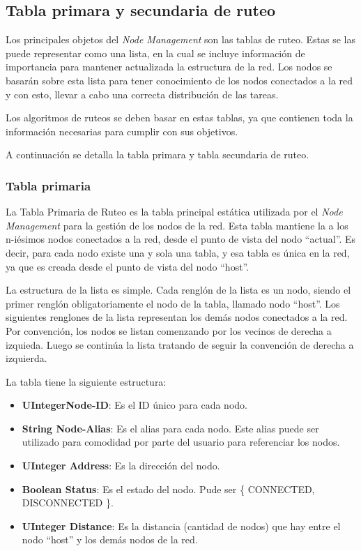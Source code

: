 \subsection{Tabla primara y secundaria de ruteo}\label{subsection:tablaprimariaysecundaria}
Los principales objetos del \textit{Node Management} son las tablas de ruteo.
Estas se las puede representar como una lista, en la cual se incluye
información de importancia para mantener actualizada la estructura de la red.
Los nodos se basarán sobre esta lista para tener conocimiento de los nodos
conectados a la red y con esto, llevar a cabo una correcta distribución de las
tareas.

Los algoritmos de ruteos se deben basar en estas tablas, ya que contienen toda
la información necesarias para cumplir con sus objetivos.

A continuación se detalla la tabla primara y tabla secundaria de ruteo.

\subsubsection{Tabla primaria}
La Tabla Primaria de Ruteo es la tabla principal estática utilizada por el
\textit{Node Management} para la gestión de los nodos de la red. Esta tabla
mantiene la a los n-iésimos nodos conectados a la red, desde el punto de vista
del nodo ``actual''. Es decir, para cada nodo existe una y sola una tabla, y esa
tabla es única en la red, ya que es creada desde el punto de vista del nodo
``host''.

La estructura de la lista es simple. Cada renglón de la lista es un nodo, siendo
el primer renglón obligatoriamente el nodo de la tabla, llamado nodo ``host''.
Los siguientes renglones de la lista representan los demás nodos conectados a la
red. Por convención, los nodos se listan comenzando por los vecinos de derecha a
izquieda. Luego se continúa la lista tratando de seguir la convención de derecha
a izquierda.

La tabla tiene la siguiente estructura:
\begin{itemize}
\item \textbf{UIntegerNode-ID}: Es el ID único para cada nodo. 
\item \textbf{String Node-Alias}: Es el alias para cada nodo. Este alias puede
  ser utilizado para comodidad por parte del usuario para referenciar los nodos.
\item \textbf{UInteger Address}: Es la dirección del nodo.  
\item \textbf{Boolean Status}: Es el estado del nodo. Pude ser \{ CONNECTED,
  DISCONNECTED \}.
\item \textbf{UInteger Distance}: Es la distancia (cantidad de nodos) que hay
  entre el nodo  ``host'' y los demás nodos de la red. 
\end{itemize}

